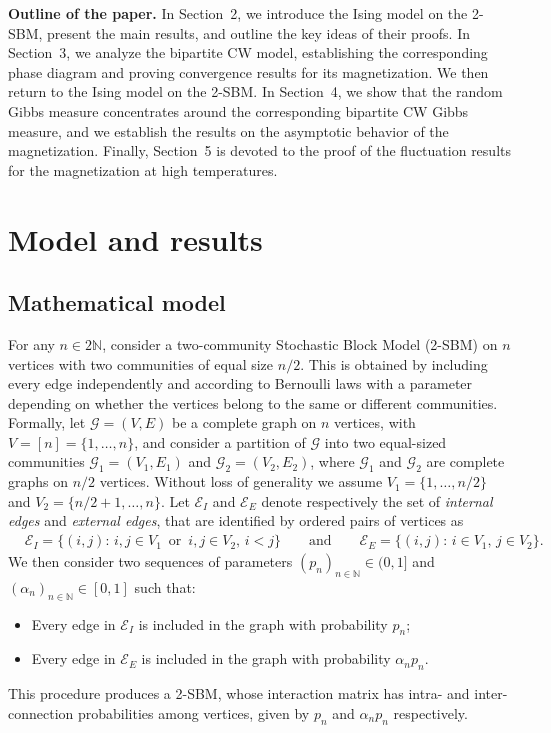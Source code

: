 \documentclass[11pt,oneside]{amsart}
\numberwithin{equation}{section}  %
\theoremstyle{plain}
\theoremstyle{remark}
\def \N {{\mathbb N}}
\def \cE {\mathcal{E}}
\begin{document}
\noindent
{\bf Outline of the paper.} In Section~2, we introduce the Ising model on the 2-SBM, 
present the main results, and outline the key ideas of their proofs. 
In Section~3, we analyze the bipartite CW model, establishing the corresponding phase diagram and 
proving convergence results for its magnetization.
We then return to the Ising model on the 2-SBM. In Section~4, we show that the random Gibbs measure concentrates 
around the corresponding bipartite CW Gibbs measure, and we establish the results on the asymptotic behavior of the magnetization. 
Finally, Section~5 is devoted to the proof of the fluctuation results for the magnetization at high temperatures.



\section{Model and results}\label{sec:ER}

\subsection{Mathematical model}
For any $n \in 2\mathbb{N}$, consider a two-community Stochastic Block Model (2-SBM) on $n$ vertices with two communities of  equal size $n/2$.  This is obtained by including every edge independently and according to Bernoulli laws with a parameter depending on whether the vertices belong to the same or different communities. Formally,  let $\mathscr{G}=(V,E)$ be a complete graph on $n$ vertices, with $V=[n]=\{1,\ldots,n\}$, and consider a partition of  $\mathscr{G}$ into two equal-sized communities $\mathscr{G}_1=(V_1, E_1)$ and $\mathscr{G}_2=(V_2, E_2)$, where $\mathscr{G}_1$ and $\mathscr{G}_2$  are complete graphs  on $n/2$ vertices. Without loss of generality we assume $V_1=\{1,\ldots, n/2\}$ and $V_2=\{n/2+1,\ldots, n\}$. Let $\cE_I$ and $\cE_E$ denote respectively the set of \textit{internal edges} and \textit{external edges}, that are identified by ordered pairs of vertices as
\begin{align*}
    &\cE_I=\{(i,j):\, i,j\in V_1 \, \text{  or  }\,  i,j\in V_2,\, i<j\} \qquad \text{and} \qquad \cE_E=\{(i,j):\, i\in V_1,\, j\in V_2 \} .
\end{align*}
We then consider two sequences of parameters $(p_n)_{n\in\N}\in(0,1]$ and $(\alpha_n)_{n\in\N}\in[0,1]$ such that:
\begin{itemize}
\item[-\,] Every edge in $\cE_I$ is included in the graph with  probability $p_n$;
\item[-\,] Every edge in $\cE_E$ is included in the graph with  probability $\alpha_n p_n$.
\end{itemize}
This procedure produces a 2-SBM, whose interaction matrix has intra- and inter-connection probabilities among vertices, given by
$p_n$  and $\alpha_n p_n$ respectively.\\
\end{document}
